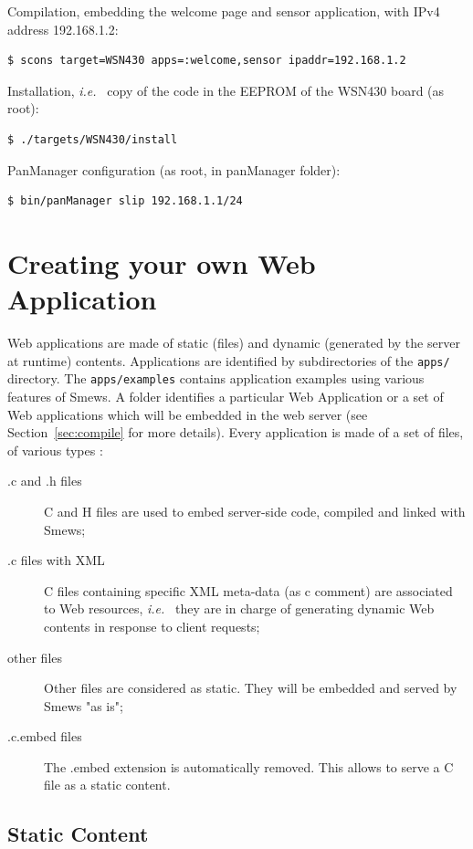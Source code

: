 \documentclass{report}
\newcommand{\ie}{{\it i.e.}~}
\newcommand{\rsec}[1]{Section~\ref{sec:#1}}
\begin{document}
Compilation, embedding the welcome page and sensor application, with IPv4 address 192.168.1.2:
\begin{verbatim}
$ scons target=WSN430 apps=:welcome,sensor ipaddr=192.168.1.2
\end{verbatim}

Installation, \ie{} copy of the code in the EEPROM of the WSN430 board (as root):
\begin{verbatim}
$ ./targets/WSN430/install
\end{verbatim}

PanManager configuration (as root, in panManager folder):
\begin{verbatim}
$ bin/panManager slip 192.168.1.1/24
\end{verbatim}

\chapter{Creating your own Web Application}
\label{ch:creatingapp}

Web applications are made of static (files) and dynamic (generated by the server at runtime) contents. Applications are identified by subdirectories of the \texttt{apps/} directory. The \texttt{apps/examples} contains application examples using various features of Smews. A folder identifies a particular Web Application or a set of Web applications which will be embedded in the web server (see \rsec{compile} for more details). Every application is made of a set of files, of various types :
\begin{description}
\item[.c and .h files] C and H files are used to embed server-side code, compiled and linked with Smews;
\item[.c files with XML] C files containing specific XML meta-data (as c comment) are associated to Web resources, \ie{} they are in charge of generating dynamic Web contents in response to client requests;
\item[other files] Other files are considered as static. They will be embedded and served by Smews "as is";
\item[.c.embed files] The .embed extension is automatically removed. This allows to serve a C file as a static content.
\end{description}

\section{Static Content}
\end{document}
